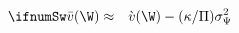 \begin{eqnarray}
  \label{eq:vBar}
\ifnumSw  \bar{v}(\W) & \approx & \grave{v}(\W)-(\kappa/\Pi)\sigma^{2}_{\Psi} \label{eq:vApproxSticky}
\end{eqnarray}
